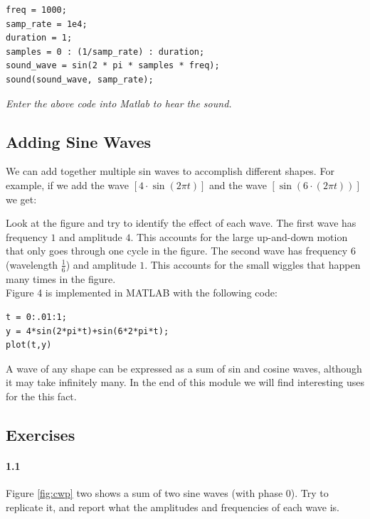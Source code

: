 \documentclass{article}
\begin{document}
\begin{verbatim}
freq = 1000;                
samp_rate = 1e4;
duration = 1;
samples = 0 : (1/samp_rate) : duration;
sound_wave = sin(2 * pi * samples * freq);
sound(sound_wave, samp_rate);
\end{verbatim}
{\it Enter the above code into Matlab to hear the sound.}


\subsection{Adding Sine Waves}
We can add together multiple sin waves to accomplish different shapes.  For example, if we add the wave $[4\cdot \sin(2\pi t)]$ and the wave  $[\sin(6\cdot(2\pi t))]$ we get:

Look at the figure and try to identify the effect of each wave.  The first wave has frequency $1$ and amplitude $4$.  This accounts for the large up-and-down motion that only goes through one cycle in the figure.  The second wave has frequency $6$ (wavelength $\frac{1}{6}$) and amplitude $1$.  This accounts for the small wiggles that happen many times in the figure.\\

Figure 4 is implemented in MATLAB with the following code:

\begin{verbatim}
t = 0:.01:1;
y = 4*sin(2*pi*t)+sin(6*2*pi*t);
plot(t,y)
\end{verbatim}
A wave of any shape can be expressed as a sum of sin and cosine waves, although it may take infinitely many.  In the end of this module we will find interesting uses for the this fact.

\subsection*{Exercises}
\paragraph{1.1} Figure \ref{fig:cwp} two shows a sum of two sine waves (with phase $0$).  Try to replicate it, and report what the amplitudes and frequencies of each wave is.
%
\end{document}
